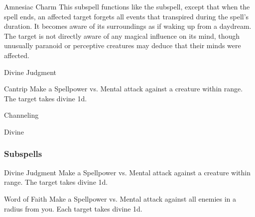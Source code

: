 \begin{ability}[\nth{7}]{Amnesiac Charm}
This subspell functions like the  subspell, except that when the spell ends, an affected target forgets all events that transpired during the spell's duration.
It becomes aware of its surroundings as if waking up from a daydream.
The target is not directly aware of any magical influence on its mind, though unusually paranoid or perceptive creatures may deduce that their minds were affected.
\end{ability}
\vspace{0.25em}

\newpage
\begin{spellsection}{Divine Judgment}

\begin{spellheader}
\end{spellheader}


\begin{ability}{Cantrip}
Make a Spellpower vs. Mental attack against a creature within \rngmed range.
\hit The target takes divine  \minus1d.
\end{ability}




 Channeling

 Divine
\end{spellsection}


\subsubsection{Subspells}


\begin{ability}[\nth{1}]{Divine Judgment}
Make a Spellpower vs. Mental attack against a creature within \rngmed range.
\hit The target takes divine  \plus1d.
\end{ability}
\vspace{0.25em}


\begin{ability}[\nth{2}]{Word of Faith}
Make a Spellpower vs. Mental attack against all enemies in a \areamed radius from you.
\hit Each target takes divine  \minus1d.
\end{ability}
\vspace{0.25em}

